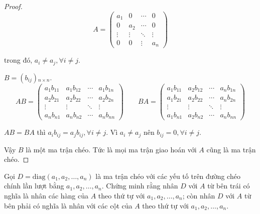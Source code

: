 \documentclass[class=linearalgebra,crop=false]{standalone}
\begin{document}
\begin{proof}
    \[
        A =
        \begin{pmatrix}
            a_{1}  & 0      & \cdots & 0      \\
            0      & a_{2}  & \cdots & 0      \\
            \vdots & \vdots & \ddots & \vdots \\
            0      & 0      & \vdots & a_{n}
        \end{pmatrix}
    \]
    \par trong đó, $a_{i}\ne a_{j},\forall i\ne j$.
    \par $B = (b_{ij}){}_{n\times n}$.
    \[
        AB =
        \begin{pmatrix}
            a_{1}b_{11} & a_{1}b_{12} & \cdots & a_{1}b_{1n} \\
            a_{2}b_{21} & a_{2}b_{22} & \cdots & a_{2}b_{2n} \\
            \vdots      & \vdots      & \ddots & \vdots      \\
            a_{n}b_{n1} & a_{n}b_{n2} & \cdots & a_{n}b_{nn}
        \end{pmatrix}
        \qquad
        BA =
        \begin{pmatrix}
            a_{1}b_{11} & a_{2}b_{12} & \cdots & a_{n}b_{1n} \\
            a_{1}b_{21} & a_{2}b_{22} & \cdots & a_{n}b_{2n} \\
            \vdots      & \vdots      & \ddots & \vdots      \\
            a_{1}b_{n1} & a_{2}b_{n2} & \cdots & a_{n}b_{nn}
        \end{pmatrix}
    \]
    \par $AB = BA$ thì $a_{i}b_{ij} = a_{j}b_{ij},\forall i\ne j$. Vì $a_{i} \ne a_{j}$ nên $b_{ij} = 0,\forall i\ne j$.
    \par Vậy $B$ là một ma trận chéo. Tức là mọi ma trận giao hoán với $A$ cũng là ma trận chéo.
\end{proof}

\begin{exercise}
    Gọi $D = \text{diag}(a_{1},a_{2},\ldots,a_{n})$ là ma trận chéo với các yếu tố trên đường chéo chính lần lượt bằng $a_{1}, a_{2}, \ldots, a_{n}$. Chứng minh rằng nhân $D$ với $A$ từ bên trái có nghĩa là nhân các hàng của $A$ theo thứ tự với $a_{1}, a_{2},\ldots,a_{n}$; còn nhân $D$ với $A$ từ bên phải có nghĩa là nhân với các cột của $A$ theo thứ tự với $a_{1}, a_{2}, \ldots, a_{n}$.
\end{exercise}
\end{document}
